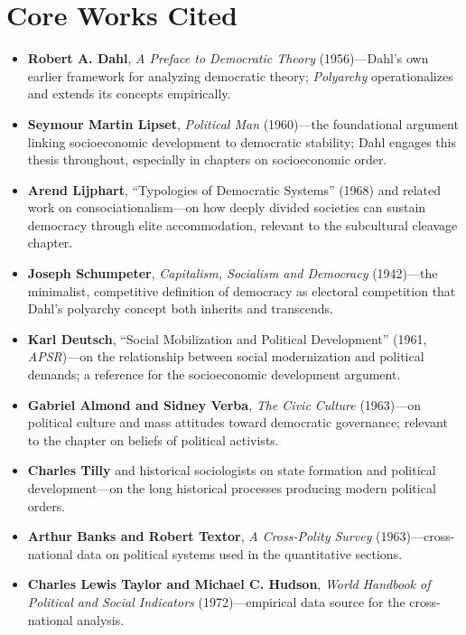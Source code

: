 \documentclass[12pt]{article}
\begin{document}
\section{Core Works Cited}

\begin{itemize}[leftmargin=*, itemsep=4pt]
    \item \textbf{Robert A. Dahl}, \textit{A Preface to Democratic Theory} (1956)---Dahl's own earlier framework for analyzing democratic theory; \textit{Polyarchy} operationalizes and extends its concepts empirically.
    \item \textbf{Seymour Martin Lipset}, \textit{Political Man} (1960)---the foundational argument linking socioeconomic development to democratic stability; Dahl engages this thesis throughout, especially in chapters on socioeconomic order.
    \item \textbf{Arend Lijphart}, ``Typologies of Democratic Systems'' (1968) and related work on consociationalism---on how deeply divided societies can sustain democracy through elite accommodation, relevant to the subcultural cleavage chapter.
    \item \textbf{Joseph Schumpeter}, \textit{Capitalism, Socialism and Democracy} (1942)---the minimalist, competitive definition of democracy as electoral competition that Dahl's polyarchy concept both inherits and transcends.
    \item \textbf{Karl Deutsch}, ``Social Mobilization and Political Development'' (1961, \textit{APSR})---on the relationship between social modernization and political demands; a reference for the socioeconomic development argument.
    \item \textbf{Gabriel Almond and Sidney Verba}, \textit{The Civic Culture} (1963)---on political culture and mass attitudes toward democratic governance; relevant to the chapter on beliefs of political activists.
    \item \textbf{Charles Tilly} and historical sociologists on state formation and political development---on the long historical processes producing modern political orders.
    \item \textbf{Arthur Banks and Robert Textor}, \textit{A Cross-Polity Survey} (1963)---cross-national data on political systems used in the quantitative sections.
    \item \textbf{Charles Lewis Taylor and Michael C. Hudson}, \textit{World Handbook of Political and Social Indicators} (1972)---empirical data source for the cross-national analysis.

\end{itemize}
\end{document}
